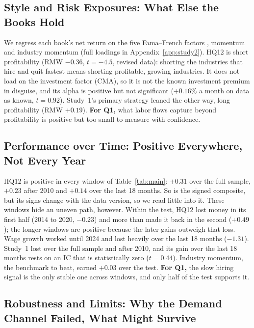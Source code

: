 \documentclass[11pt,letterpaper]{article}
\begin{document}
\subsection{Style and Risk Exposures: What Else the Books Hold}\label{sec:style}
We regress each book's net return on the five Fama--French factors
\citep{famafrench2015}, momentum \citep{carhart1997} and industry momentum (full
loadings in Appendix~\ref{app:study2}). HQ12 is
short profitability (RMW $-0.36$, $t=-4.5$, revised data): shorting the industries that hire
and quit fastest means shorting profitable, growing industries. It does not
load on the investment factor (CMA), so it is not the known investment premium
in disguise, and its alpha is positive but not significant ($+0.16\%$ a month
on data as known, $t=0.92$). Study~1's primary strategy leaned the other way,
long profitability (RMW $+0.19$). \textbf{For Q1,} what labor flows capture beyond
profitability is positive but too small to measure with confidence.

\subsection{Performance over Time: Positive Everywhere, Not Every Year}\label{sec:time}
HQ12 is positive in every window of Table~\ref{tab:main}: $+0.31$ over the
full sample, $+0.23$ after 2010 and $+0.14$ over the last 18 months. So is the
signed composite, but its signs change with the data version, so we read little
into it. These windows hide an uneven path, however. Within the test, HQ12 lost
money in its first half (2014 to 2020, $-0.23$) and more than made it back in
the second ($+0.49$); the longer windows are positive because the later gains
outweigh that loss. Wage growth worked until 2024 and
lost heavily over the last 18 months ($-1.31$). Study~1 lost over the
full sample and after 2010, and its gain over the last 18 months rests on an IC
that is statistically zero ($t=0.44$). Industry momentum, the benchmark to
beat, earned $+0.03$ over the test. \textbf{For Q1,} the slow hiring signal is the only stable one across windows,
and only half of the test supports it.

\subsection{Robustness and Limits: Why the Demand Channel Failed, What Might Survive}\label{sec:robust}
\end{document}
